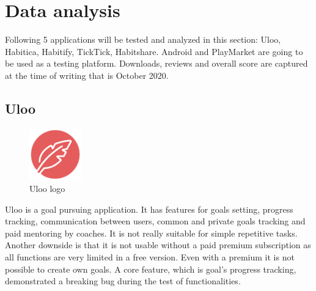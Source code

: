 \section{Data analysis}\label{sec:data-analysis}

Following 5 applications will be tested and analyzed in this section: Uloo, Habitica, Habitify, TickTick, Habitshare.
Android and PlayMarket are going to be used as a testing platform.
Downloads, reviews and overall score are captured at the time of writing that is October 2020.

\subsection{Uloo}\label{subsec:uloo}

\begin{figure}[h!]
    \includegraphics[width=0.20\textwidth]{images/uloo-logo.png}
    \caption{Uloo logo~\cite{uloo-logo}}
    \label{fig:uloo-logo}
\end{figure}

Uloo is a goal pursuing application.
It has features for goals setting, progress tracking, communication between users, common and private goals tracking and paid mentoring by coaches.
It is not really suitable for simple repetitive tasks.
Another downside is that it is not usable without a paid premium subscription as all functions are very limited in a free version.
Even with a premium it is not possible to create own goals.
A core feature, which is goal's progress tracking, demonstrated a breaking bug during the test of functionalities.


